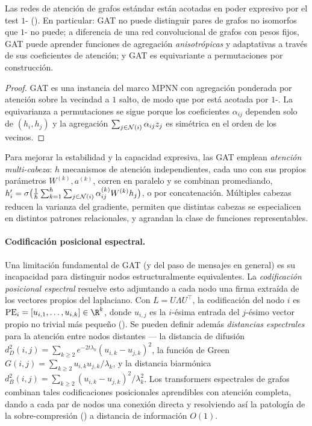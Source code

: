\begin{proposition}
\label{prop:graphs:gat}
Las redes de atenci\'on de grafos est\'andar est\'an acotadas en poder expresivo
por el test $1$-\WL{} (). En particular: GAT no puede
distinguir pares de grafos no isomorfos que $1$-\WL{} no puede; a diferencia de
una red convolucional de grafos con pesos fijos, GAT puede aprender funciones de
agregaci\'on \emph{anisotr\'opicas} y adaptativas a trav\'es de sus coeficientes
de atenci\'on; y GAT es equivariante a permutaciones por construcci\'on.
\end{proposition}

\begin{proof}
GAT es una instancia del marco MPNN con agregaci\'on ponderada por atenci\'on
sobre la vecindad a $1$ salto, de modo que por  est\'a
acotada por $1$-\WL. La equivarianza a permutaciones se sigue porque los
coeficientes $\alpha_{ij}$ dependen solo de $(h_i, h_j)$ y la agregaci\'on
$\sum_{j \in \mathcal{N}(i)} \alpha_{ij} z_j$ es sim\'etrica en el orden de los vecinos.
\end{proof}

Para mejorar la estabilidad y la capacidad expresiva, las GAT emplean
\emph{atenci\'on multi-cabeza}: $h$ mecanismos de atenci\'on independientes, cada
uno con sus propios par\'ametros $W^{(k)}, a^{(k)}$, corren en paralelo y se
combinan promediando,
$h_i' = \sigma\big(\tfrac1h \sum_{k=1}^h \sum_{j \in \mathcal{N}(i)} \alpha_{ij}^{(k)}
W^{(k)} h_j\big)$, o por concatenaci\'on. M\'ultiples cabezas reducen la varianza
del gradiente, permiten que distintas cabezas se especialicen en distintos
patrones relacionales, y agrandan la clase de funciones representables.

\paragraph{Codificaci\'on posicional espectral.}
Una limitaci\'on fundamental de GAT (y del paso de mensajes en general) es su
incapacidad para distinguir nodos estructuralmente equivalentes. La
\emph{codificaci\'on posicional espectral} resuelve esto adjuntando a cada nodo
una firma extra\'ida de los vectores propios del laplaciano. Con
$L = U\Lambda U^\top$, la codificaci\'on del nodo $i$ es
$\operatorname{PE}_i = [u_{i,1}, \dots, u_{i,k}] \in \R^k$, donde $u_{i,j}$ es la
$i$-\'esima entrada del $j$-\'esimo vector propio no trivial m\'as peque\~no
(). Se pueden definir adem\'as \emph{distancias espectrales}
para la atenci\'on entre nodos distantes --- la distancia de difusi\'on
$d_D^2(i,j) = \sum_{k\ge2} e^{-2t\lambda_k}(u_{i,k} - u_{j,k})^2$, la funci\'on de
Green $G(i,j) = \sum_{k\ge2} u_{i,k} u_{j,k}/\lambda_k$, y la distancia
biarm\'onica $d_B^2(i,j) = \sum_{k\ge2}(u_{i,k} - u_{j,k})^2/\lambda_k^2$. Los
transformers espectrales de grafos~\citep{kreuzer2021spectral} combinan tales
codificaciones posicionales aprendibles con atenci\'on completa, dando a cada par
de nodos una conexi\'on directa y resolviendo as\'i la patolog\'ia de la
sobre-compresi\'on () a distancia de informaci\'on
$O(1)$.

